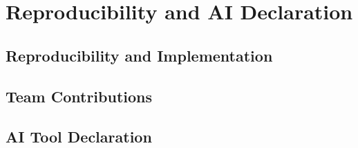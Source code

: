 \section{Reproducibility and AI Declaration}

\subsection{Reproducibility and Implementation}

\subsection{Team Contributions}

\subsection{AI Tool Declaration}